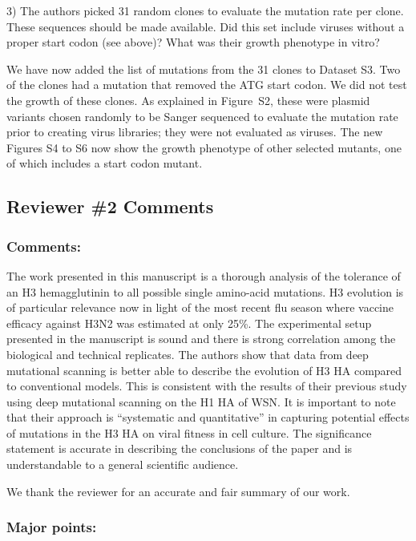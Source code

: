 \documentclass[11pt, oneside]{article}   	%
\newcommand{\response}[1]{{\color{black}#1}}
\begin{document}
3) The authors picked 31 random clones to evaluate the mutation rate per clone. These sequences should be made available. Did this set include viruses without a proper start codon (see above)? What was their growth phenotype in vitro? 

\response{We have now added the list of mutations from the 31 clones to Dataset S3.
Two of the clones had a mutation that removed the ATG start codon.
We did not test the growth of these clones. 
As explained in Figure~S2, these were plasmid variants chosen randomly to be Sanger sequenced to evaluate the mutation rate prior to creating virus libraries; they were not evaluated as viruses.
The new Figures S4 to S6 now show the growth phenotype of other selected mutants, one of which includes a start codon mutant.
}

\subsection*{Reviewer \#2 Comments} 

\subsubsection*{Comments:} 
The work presented in this manuscript is a thorough analysis of the tolerance of an H3 hemagglutinin to all possible single amino-acid mutations. H3 evolution is of particular relevance now in light of the most recent flu season where vaccine efficacy against H3N2 was estimated at only 25\%. The experimental setup presented in the manuscript is sound and there is strong correlation among the biological and technical replicates. The authors show that data from deep mutational scanning is better able to describe the evolution of H3 HA compared to conventional models. This is consistent with the results of their previous study using deep mutational scanning on the H1 HA of WSN. It is important to note that their approach is ``systematic and quantitative'' in capturing potential effects of mutations in the H3 HA on viral fitness in cell culture. The significance statement is accurate in describing the conclusions of the paper and is understandable to a general scientific audience. 

\response{We thank the reviewer for an accurate and fair summary of our work.}

\subsubsection*{Major points:} 
\end{document}
